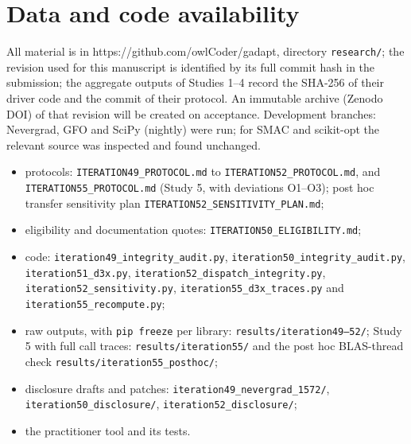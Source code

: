 \documentclass[acmsmall,screen,review,anonymous=false]{acmart}
\providecommand{\tightlist}{\setlength{\itemsep}{0pt}\setlength{\parskip}{0pt}}
\begin{document}
\section{Data and code availability}\label{data-and-code-availability}

All material is in https://github.com/owlCoder/gadapt, directory \texttt{research/}; the revision used for this
manuscript is identified by its full commit hash in the submission; the aggregate outputs of Studies 1--4 record the
SHA-256 of their driver code and the commit of their protocol. An immutable archive (Zenodo DOI) of that revision will be created on acceptance. Development branches: Nevergrad, GFO and SciPy (nightly) were run; for SMAC and scikit-opt
the relevant source was inspected and found unchanged.

\begin{itemize}
\tightlist
\item
  protocols: \texttt{ITERATION49\_\allowbreak{}PROTOCOL.\allowbreak{}md} to \texttt{ITERATION52\_\allowbreak{}PROTOCOL.\allowbreak{}md}, and \texttt{ITERATION55\_\allowbreak{}PROTOCOL.\allowbreak{}md} (Study 5, with
  deviations O1--O3); post hoc transfer sensitivity plan \texttt{ITERATION52\_\allowbreak{}SENSITIVITY\_\allowbreak{}PLAN.\allowbreak{}md};
\item
  eligibility and documentation quotes: \texttt{ITERATION50\_\allowbreak{}ELIGIBILITY.\allowbreak{}md};
\item
  code: \texttt{iteration49\_\allowbreak{}integrity\_\allowbreak{}audit.\allowbreak{}py}, \texttt{iteration50\_\allowbreak{}integrity\_\allowbreak{}audit.\allowbreak{}py}, \texttt{iteration51\_\allowbreak{}d3x.\allowbreak{}py},
  \texttt{iteration52\_\allowbreak{}dispatch\_\allowbreak{}integrity.\allowbreak{}py}, \texttt{iteration52\_\allowbreak{}sensitivity.\allowbreak{}py}, \texttt{iteration55\_\allowbreak{}d3x\_\allowbreak{}traces.\allowbreak{}py} and
  \texttt{iteration55\_\allowbreak{}recompute.\allowbreak{}py};
\item
  raw outputs, with \texttt{pip\ freeze} per library: \texttt{results/\allowbreak{}iteration49–52/}; Study 5 with full call traces:
  \texttt{results/\allowbreak{}iteration55/} and the post hoc BLAS-thread check \texttt{results/\allowbreak{}iteration55\_\allowbreak{}posthoc/};
\item
  disclosure drafts and patches: \texttt{iteration49\_\allowbreak{}nevergrad\_\allowbreak{}1572/}, \texttt{iteration50\_\allowbreak{}disclosure/},
  \texttt{iteration52\_\allowbreak{}disclosure/};
\item
  the practitioner tool and its tests.
\end{itemize}
\end{document}
